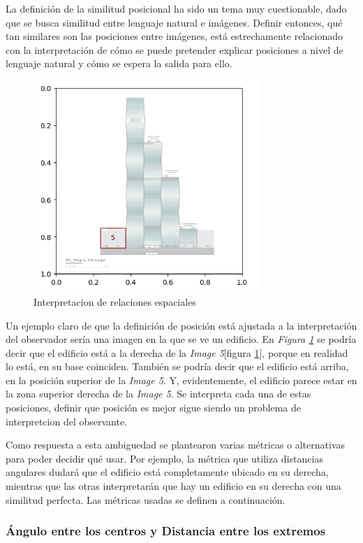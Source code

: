 La definición de la similitud posicional ha sido un tema muy cuestionable, dado que se busca similitud entre lenguaje natural e imágenes. Definir entonces, qu\'e tan similares son las posiciones entre imágenes, está estrechamente relacionado con la interpretación de cómo se puede pretender explicar posiciones a nivel de lenguaje natural y cómo se espera la salida para ello.

\begin{figure}[H]
\centering
\includegraphics[height=80mm]{Graphics/building.png}
\caption{Interpretacion de relaciones espaciales}
\label{fig:edificio}
\end{figure}

Un ejemplo claro de que la definición de posición está ajustada a la interpretación del observador sería una imagen en la que se ve un edificio. En \textit{Figura \ref{fig:edificio}} se podría decir que el edificio está a la derecha de la \textit{Image 5}[figura \ref{fig:edificio}], porque en realidad lo está, en su base coinciden. También se podría decir que el edificio está arriba, en la posición superior de la \textit{Image 5}. Y, evidentemente, el edificio parece estar en la zona superior derecha de la \textit{Image 5}. Se interpreta cada una de estas posiciones, definir que posici\'on es mejor sigue siendo un problema de interpretcion del observante.

Como respuesta a esta ambiguedad se plantearon varias métricas o alternativas para poder decidir qué usar. Por ejemplo, la métrica que utiliza distancias angulares dudará que el edificio está completamente ubicado en su derecha, mientras que las otras interpretarán que hay un edificio en su derecha con una similitud perfecta. Las métricas usadas se definen a continuación.

\subsubsection{Ángulo entre los centros y Distancia entre los extremos}

